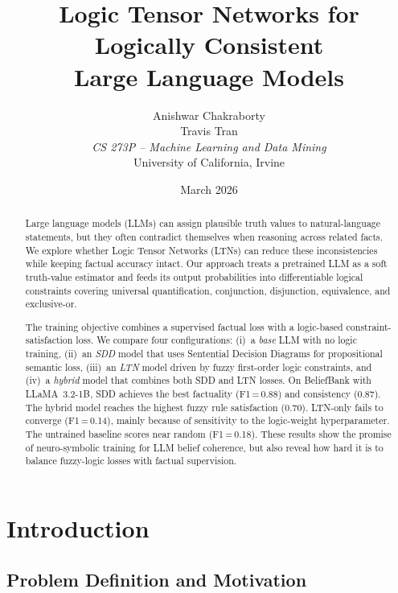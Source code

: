 \documentclass[11pt,a4paper]{article}
\title{%
  Logic Tensor Networks for Logically Consistent\\
  Large Language Models}
\author{
  Anishwar Chakraborty \\
  Travis Tran \\
  \textit{CS 273P -- Machine Learning and Data Mining} \\
  University of California, Irvine
}
\date{March 2026}
\begin{document}
\maketitle

\begin{abstract}
Large language models (LLMs) can assign plausible truth values to
natural-language statements, but they often contradict themselves when
reasoning across related facts.  We explore whether Logic Tensor Networks
(LTNs) can reduce these inconsistencies while keeping factual accuracy
intact.  Our approach treats a pretrained LLM as a soft truth-value estimator
and feeds its output probabilities into differentiable logical constraints
covering universal quantification, conjunction, disjunction, equivalence,
and exclusive-or.

The training objective combines a supervised factual loss with a logic-based
constraint-satisfaction loss.  We compare four configurations:
(i)~a \emph{base} LLM with no logic training,
(ii)~an \emph{SDD} model that uses Sentential Decision Diagrams for
propositional semantic loss,
(iii)~an \emph{LTN} model driven by fuzzy first-order logic constraints,
and (iv)~a \emph{hybrid} model that combines both SDD and LTN losses.
On BeliefBank with LLaMA~3.2-1B, SDD achieves the best factuality
(F1\,=\,0.88) and consistency (0.87).  The hybrid model reaches the highest
fuzzy rule satisfaction (0.70).  LTN-only fails to converge
(F1\,=\,0.14), mainly because of sensitivity to the logic-weight
hyperparameter.  The untrained baseline scores near random (F1\,=\,0.18).
These results show the promise of neuro-symbolic training for LLM belief
coherence, but also reveal how hard it is to balance fuzzy-logic losses
with factual supervision.
\end{abstract}

\section{Introduction}

\subsection{Problem Definition and Motivation}
\end{document}
